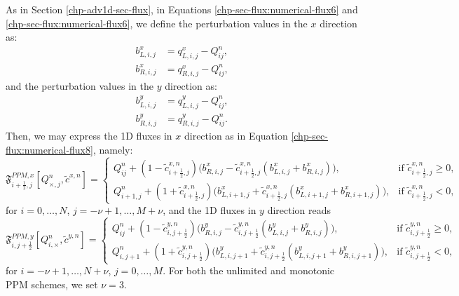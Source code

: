As in Section \ref{chp-adv1d-sec-flux}, 
in Equations \eqref{chp-sec-flux:numerical-flux6} and \eqref{chp-sec-flux:numerical-flux6}, 
we define the perturbation values in the $x$ direction as:
\begin{align}
\label{chp-adv2d-pertb-xL}
b_{L,i,j}^x &= q_{L,i,j}^x - Q_{ij}^n, \\
\label{chp-adv2d-pertb-xR}
b_{R,i,j}^x &= q_{R,i,j}^x - Q_{ij}^n,
\end{align}
and the perturbation values in the $y$ direction as:
\begin{align}
\label{chp-adv2d-pertb-yL}
b_{L,i,j}^y &= q_{L,i,j}^y - Q_{ij}^n, \\
\label{chp-adv2d-pertb-yR}
b_{R,i,j}^y &= q_{R,i,j}^y - Q_{ij}^n.
\end{align}
Then, we may express the 1D fluxes in $x$ direction as in Equation \eqref{chp-sec-flux:numerical-flux8}, namely:
\begin{equation}
	\label{chp-adv2d-flux-xdir}
        \mathfrak{F}_{i+\frac{1}{2},j}^{PPM,x}[Q_{\times,j}^n,\tilde{c}^{x,n}]  =  
    	\begin{cases}
        Q_{ij}^n +
        (1-\tilde{c}_{{i+\frac{1}{2},j}}^{x,n})
        \big(b_{R,i,j}^x-\tilde{c}_{{i+\frac{1}{2},j}}^{x,n}
        (b_{L,i,j}^x+b_{R,i,j}^x)\big),
	& \text{if } \tilde{c}_{i+\frac{1}{2},j}^{x,n} \geq 0,\\
	Q_{i+1,j}^n +
        (1+\tilde{c}_{{i+\frac{1}{2},j}}^{x,n})
        \big(b_{L,i+1,j}^x+\tilde{c}_{{i+\frac{1}{2},j}}^{x,n}
        (b_{L,i+1,j}^x+b_{R,i+1,j}^x)\big),
	& \text{if } \tilde{c}_{i+\frac{1}{2},j}^{x,n}<0,
    	\end{cases}
\end{equation}
for $i=0, \ldots, N$, $j=-\nu+1, \ldots, M + \nu$, and the 1D fluxes in $y$ direction reads
\begin{equation}
	\label{chp-adv2d-flux-ydir}
        \mathfrak{F}_{i,j+\frac{1}{2}}^{PPM,y}[Q_{i,\times}^n,\tilde{c}^{y,n}]  =  
    	\begin{cases}
        Q_{ij}^n +
        (1-\tilde{c}_{{i,j+\frac{1}{2}}}^{y,n})
        \big(b_{R,i,j}^y-\tilde{c}_{{i,j+\frac{1}{2}}}^{y,n}
        (b_{L,i,j}^y+b_{R,i,j}^y)\big),
	& \text{if } \tilde{c}_{i,j+\frac{1}{2}}^{y,n} \geq 0,\\
	Q_{i,j+1}^n +
        (1+\tilde{c}_{{i,j+\frac{1}{2}}}^{y,n})
        \big(b_{L,i,j+1}^y+\tilde{c}_{{i,j+\frac{1}{2}}}^{y,n}
        (b_{L,i,j+1}^y+b_{R,i,j+1}^y)\big),
	& \text{if } \tilde{c}_{i,j+\frac{1}{2}}^{y,n}<0,
    	\end{cases}
\end{equation}
for $i=-\nu+1, \ldots, N + \nu$, $j=0, \ldots, M$.
For both the unlimited and monotonic PPM schemes, we set $\nu=3$.

